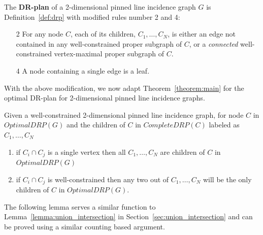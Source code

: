 \begin{definition}

 The \textbf{DR-plan} of  a 2-dimensional pinned line incidence graph $G$ is Definition~\ref{def:drp} with  modified rules number 2 and 4:
    \begin{enumerate}
        \item[2] For any node $C$, each of its children, $C_1,\ldots,C_N$, is either an edge not contained in any well-constrained proper subgraph of $C$, or a {\em connected} well-constrained vertex-maximal proper subgraph of  $C$.
        \item[4] A node containing a single edge is a leaf.
    \end{enumerate}
\end{definition}


With the above modification,
we now adapt Theorem~\ref{theorem:main} %
for the optimal DR-plan for 2-dimensional pinned line incidence graphs.


\begin{corollary}
Given a well-constrained 2-dimensional pinned line incidence graph, for node $C$ in $OptimalDRP(G)$ and the children of $C$ in $CompleteDRP(C)$ labeled as $C_1,\ldots,C_N$
\begin{enumerate}
    \item if $C_i \cap C_j$ is a single vertex then all $C_1,\ldots,C_N$ are children of $C$ in $OptimalDRP(G)$
    \item if $C_i \cap C_j$ is well-constrained then any two out of $C_1,\ldots,C_N$ will be the only children of $C$ in $OptimalDRP(G)$.
\end{enumerate}
\label{cor:pinned}
\end{corollary}

The following lemma serves a similar function to Lemma~\ref{lemma:union_intersection} in Section~\ref{sec:union_intersection}
and can be proved using a similar counting based argument.


